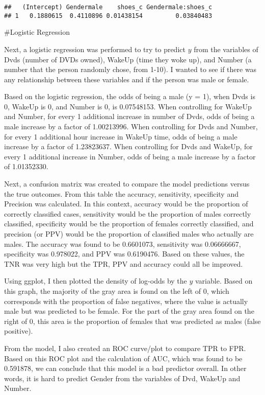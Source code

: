 \documentclass[]{article}
\begin{document}
\begin{verbatim}
##   (Intercept) Gendermale    shoes_c Gendermale:shoes_c
## 1   0.1880615  0.4110896 0.01438154         0.03840483
\end{verbatim}

\#Logistic Regression

Next, a logistic regression was performed to try to predict \(y\) from
the variables of Dvds (number of DVDs owned), WakeUp (time they woke
up), and Number (a number that the person randomly chose, from 1-10). I
wanted to see if there was any relationship between these variables and
if the person was male or female.

Based on the logistic regression, the odds of being a male (y = 1), when
Dvds is 0, WakeUp is 0, and Number is 0, is 0.07548153. When controlling
for WakeUp and Number, for every 1 additional increase in number of
Dvds, odds of being a male increase by a factor of 1.00213996. When
controlling for Dvds and Number, for every 1 additional hour increase in
WakeUp time, odds of being a male increase by a factor of 1.23823637.
When controlling for Dvds and WakeUp, for every 1 additional increase in
Number, odds of being a male increase by a factor of 1.01352330.

Next, a confusion matrix was created to compare the model predictions
versus the true outcomes. From this table the accuracy, sensitivity,
specificity and Precision was calculated. In this context, accuracy
would be the proportion of correctly classified cases, sensitivity would
be the proportion of males correctly classified, specificity would be
the proportion of females correctly classified, and precision (or PPV)
would be the proportion of classified males who actually are males. The
accuracy was found to be 0.6601073, sensitivity was 0.06666667,
specificity was 0.978022, and PPV was 0.6190476. Based on these values,
the TNR was very high but the TPR, PPV and accuracy could all be
improved.

Using ggplot, I then plotted the density of log-odds by the \(y\)
variable. Based on this graph, the majority of the gray area is found on
the left of 0, which corresponds with the proportion of false negatives,
where the value is actually male but was predicted to be female. For the
part of the gray area found on the right of 0, this area is the
proportion of females that was predicted as males (false positive).

From the model, I also created an ROC curve/plot to compare TPR to FPR.
Based on this ROC plot and the calculation of AUC, which was found to be
0.591878, we can conclude that this model is a bad predictor overall. In
other words, it is hard to predict Gender from the variables of Dvd,
WakeUp and Number.
\end{document}

